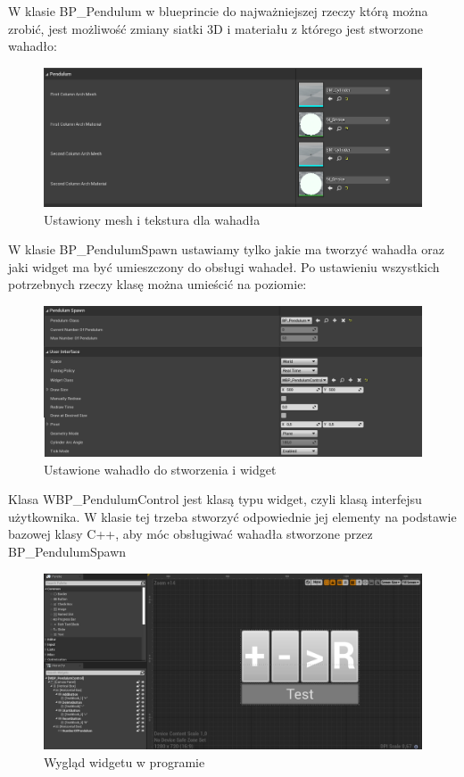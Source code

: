 \documentclass[a4paper,12pt,reqno]{article}
\begin{document}
W klasie BP\_Pendulum w blueprincie do najważniejszej rzeczy którą można zrobić, jest możliwość zmiany siatki 3D i materiału z którego jest stworzone wahadło:

\begin{figure}[H]%
\centering
\includegraphics[width=0.7\columnwidth]{graphics/pendulum/PendulumBP.png}
\caption{Ustawiony mesh i tekstura dla wahadła 
\label{BPExample}}%
%
\qquad
\end{figure}  

W klasie BP\_PendulumSpawn ustawiamy tylko jakie ma tworzyć wahadła oraz jaki widget ma być umieszczony do obsługi wahadeł. Po ustawieniu wszystkich potrzebnych rzeczy klasę można umieścić na poziomie:

\begin{figure}[H]%
\centering
\includegraphics[width=0.7\columnwidth]{graphics/pendulum/PendulumSpawnerBP.png}
\caption{Ustawione wahadło do stworzenia i widget 
\label{BPExample}}%
%
\qquad
\end{figure}  

 
Klasa WBP\_PendulumControl jest klasą typu widget, czyli klasą interfejsu użytkownika. W klasie tej trzeba stworzyć odpowiednie jej elementy na podstawie bazowej klasy C++, aby móc obsługiwać wahadła stworzone przez BP\_PendulumSpawn


\begin{figure}[H]%
\centering
\includegraphics[width=0.7\columnwidth]{graphics/pendulum/PendulumControlBP.png}
\caption{Wygląd widgetu w programie
\label{BPExample}}%
%
\qquad
\end{figure}  
\end{document}
